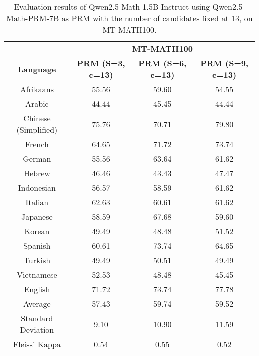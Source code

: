 \begin{table*}[]
\centering
\fontsize{10}{13} \selectfont
\begin{tabular}{c|c|c|c}
\toprule
 & \multicolumn{3}{c}{\textbf{MT-MATH100}} \\ \cmidrule{2-4}
\multirow{-2}{*}{\textbf{Language}} & \multicolumn{1}{c|}{\textbf{PRM (S=3, c=13)}} & \multicolumn{1}{c|}{\textbf{PRM (S=6, c=13)}} & \multicolumn{1}{c}{\textbf{PRM (S=9, c=13)}} \\ \midrule
Afrikaans & 55.56 & 59.60 & 54.55 \\
Arabic & 44.44 & 45.45 & 44.44 \\
Chinese (Simplified) & 75.76 & 70.71 & 79.80 \\
French & 64.65 & 71.72 & 73.74 \\
German & 55.56 & 63.64 & 61.62 \\
Hebrew & 46.46 & 43.43 & 47.47 \\
Indonesian & 56.57 & 58.59 & 61.62 \\
Italian & 62.63 & 60.61 & 61.62 \\
Japanese & 58.59 & 67.68 & 59.60 \\
Korean & 49.49 & 48.48 & 51.52 \\
Spanish & 60.61 & 73.74 & 64.65 \\
Turkish & 49.49 & 50.51 & 49.49 \\
Vietnamese & 52.53 & 48.48 & 45.45 \\
\rowcolor[HTML]{FCE5CD} 
English & 71.72 & 73.74 & 77.78 \\ \midrule
Average & 57.43 & 59.74 & 59.52 \\
Standard Deviation & 9.10 & 10.90 & 11.59 \\
Fleiss' Kappa & 0.54 & 0.55 & 0.52 \\ \bottomrule
\end{tabular}
\caption{\footnotesize Evaluation results of Qwen2.5-Math-1.5B-Instruct using Qwen2.5-Math-PRM-7B as PRM with the number of candidates fixed at 13, on MT-MATH100.}
\label{tab:1_5B_prm_7B_c13}
\end{table*}

